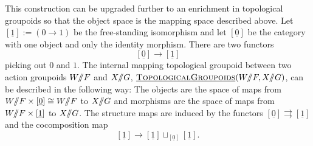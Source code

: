 This construction can be upgraded further to an enrichment in topological groupoids so that the object space is the mapping space described above.
Let \([\underline{1}] := (0 \rightarrow 1)\) be the free-standing isomorphism and let \([\underline{0}]\) be the category with one object and only the identity morphism.
There are two functors 
\[
[\underline{0}] \rightarrow [\underline{1}]
\]
picking out \(0\) and \(1\).
The internal mapping topological groupoid between two action groupoids \(W /\!\!/ F\) and \(X/\!\!/ G\), \(\operatorname{\underline{\smash{\normalfont\textsc{TopologicalGroupoids}}}}(W /\!\!/ F, X /\!\!/ G)\), can be described in the following way: The objects are the space of maps from \(W /\!\!/ F \times [\underline{0}] \cong W /\!\!/ F\) to \(X /\!\!/ G\) and morphisms are the space of maps from \(W /\!\!/ F \times [\underline{1}]\) to \(X /\!\!/ G\).
The structure maps are induced by the functors \([\underline{0}] \rightrightarrows [\underline{1}]\) and the cocomposition map
\[
[\underline{1}] \rightarrow [\underline{1}] \sqcup_{[\underline{0}]} [\underline{1}].
\]
%

